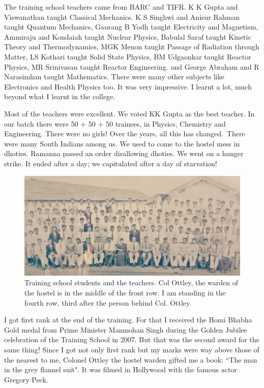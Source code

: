 The training school teachers came from BARC and TIFR. K K Gupta and 
Viswanathan taught Classical Mechanics. K S Singhwi and Anisur Rahman 
taught Quantum Mechanics, Gaurang B Yo\-dh taught Electricity and 
Magnetism, Ammiraju and Kondaiah taught Nuclear Physics, Babulal Saraf 
taught Kinetic Theory and Thermodynamics, MGK Menon taught Passage of 
Radiation thro\-ugh Matter, LS Kothari taught Solid State Physics, BM 
Udgaonkar taught Reactor Physics, MR Srinivasan taught Reactor 
Enginee\-ring. and George Abraham and R Narasimhan taught Mathema\-tics. 
There were many other subjects like Electro\-nics and Health Physics too. 
It was very impressive. I learnt a lot, much beyond what I learnt in the 
colleg\-e.

Most of the teachers were excellent. We voted KK Gupta as the best teacher.
In our batch there were 50 + 50 + 50 trainees, in Physics, Chemistry
and Engineering. There were no girls! Over the years, all this has changed.\
There were many South Indians among us. We used to come to the hostel 
mess in dhoties. Ramanna passed an order disallowing dhoties. We went on 
a hunger strike. It ended after a day; we capitulated after a day of 
starvation!

\begin{figure}[H]
\centering
\includegraphics[width=1\textwidth]{images/new-images/06-Rajaji-TS.jpg}
\caption{\small{Training school students and the teachers. Col Ottley, the warden of the hostel is in the middle of the front row. I am standing in the fourth row, third after the person behind Col. Ottley.}}
\end{figure}

I got first rank at the end of the training. For that I received the 
Homi Bhabha Gold medal from Prime Minister Manmohan Singh during the 
Golden Jubilee celebration of the Training Sch\-ool in 2007. But that was 
the second award for the same thing! Since I got not only first rank but 
my marks were way above those of the nearest to me, Colonel Ottley the 
hostel warden gifted me a book: ``The man in the grey flannel suit". It 
was filmed in Hollywood with the famous actor Gregory Peck.
 
